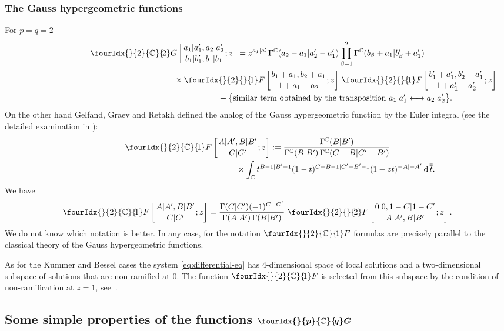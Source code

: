 \documentclass[pdftex]{sigma}
\numberwithin{equation}{section}
\newcommand{\hyp}[2]{\fourIdx{}{#1}{}{\!#2}F}
\newcommand{\hypc}[2]{\fourIdx{}{#1}{\C}{\!#2}F}
\newcommand{\Gc}[2]{\fourIdx{}{#1}{\C}{\!#2}G}
\def\C {{\mathbb C }}
\newcommand{\dd}[1]{\,{\rm d}\,{\overline{\overline{#1}}} }
\begin{document}
\subsubsection{The Gauss hypergeometric functions}
For $p=q=2$
\begin{gather*}
\Gc{2}{2}\left[\genfrac{}{}{0pt}{}{a_1|a_1',a_2|a_2'}
{b_1|b_1',b_1|b_1};z\right]
=z^{a_1|a_1'} \Gamma^\C(a_2-a_1|a_2'-a_1')
\prod_{\beta=1}^2\Gamma^\C(b_\beta+a_1|b_\beta'+a_1') \\
\hphantom{\Gc{2}{2}\left[\genfrac{}{}{0pt}{}{a_1|a_1',a_2|a_2'}
{b_1|b_1',b_1|b_1};z\right]=}{} \times
\hyp{2}{1}\left[\genfrac{}{}{0pt}{}{b_1+a_1,b_2+a_1}{1+a_1-a_2};z\right] \,
\hyp{2}{1}\left[\genfrac{}{}{0pt}{}{b_1'+a_1',b_2'+a_1'}{1+a_1'-a_2'};z\right] \\
\hphantom{\Gc{2}{2}\left[\genfrac{}{}{0pt}{}{a_1|a_1',a_2|a_2'}
{b_1|b_1',b_1|b_1};z\right]=}{}
+\big\{\text{similar term obtained by the transposition
$a_1|a_1'\longleftrightarrow a_2|a_2'$}\big\}.
\end{gather*}
On the other hand Gelfand, Graev and Retakh \cite{GGR} defined
the analog of the Gauss hypergeometric function by the Euler integral
(see the detailed examination in \cite[Section~3]{MN}):
\begin{gather}
\hypc{2}{1}\left[\genfrac{}{}{0pt}{}{A|A', B|B'}{C|C'};z\right]:=
\frac{\Gamma^{\C}(B|B')}{\Gamma^{\C}(B|B')\,\Gamma^{\C}(C-B|C'-B')} \nonumber\\
\hphantom{\hypc{2}{1}\left[\genfrac{}{}{0pt}{}{A|A', B|B'}{C|C'};z\right]:=}{} \times \int_\C t^{B-1|B'-1}(1-t)^{C-B-1|C'-B'-1}(1-zt)^{-A|-A'} \dd t.
\label{eq:Euler}
\end{gather}
We have
\[
\hypc{2}{1}\left[\genfrac{}{}{0pt}{}{A|A', B|B'}{C|C'};z\right]
=\frac{\Gamma(C|C')(-1)^{C-C'}}{\Gamma(A|A')\,\Gamma(B|B')}\,\,
\hyp{2}{2}\left[\genfrac{}{}{0pt}{}{0|0, 1-C|1-C'}{A|A', B|B' };z\right].
\]
We do not know which notation is better. In any case, for the notation
$\hypc{2}{1}$ formulas are precisely parallel to the classical
theory of the Gauss hypergeometric functions.

As for the Kummer and Bessel cases the system \eqref{eq:differential-eq}
has $4$-dimensional space of local solutions
and a two-dimensional
subspace of solutions that are non-ramified at $0$.
The function $\hypc{2}{1}$ is selected from this subspace by the condition
of non-ramification at $z=1$, see~\cite[Proposition~3.11]{MN}.

\subsection[Some simple properties of the functions $\Gc{p}{q}$]{Some simple properties of the functions $\boldsymbol{\Gc{p}{q}}$}\label{ss:simple}
\end{document}
